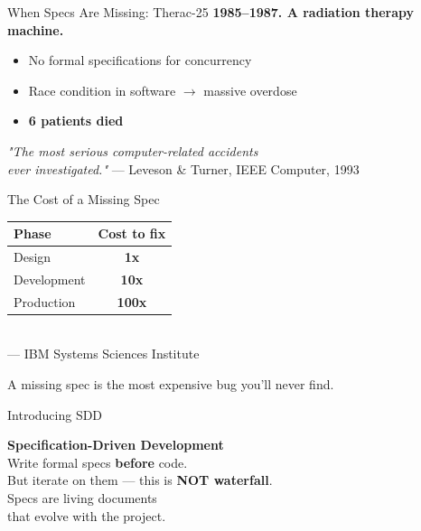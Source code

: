 \documentclass[aspectratio=169,18pt]{beamer}
\begin{document}
\begin{frame}{When Specs Are Missing: Therac-25}
  \vspace{0.3em}
  \textbf{1985--1987. A radiation therapy machine.}\\[0.8em]
  \begin{itemize}\setlength\itemsep{0.5em}
    \item No formal specifications for concurrency
    \item Race condition in software $\rightarrow$ massive overdose
    \item \textbf{\color{openred}6 patients died}
  \end{itemize}
  \vspace{0.8em}
  \small\color{opengray}\textit{"The most serious computer-related accidents\\
  ever investigated."} — Leveson \& Turner, IEEE Computer, 1993
\end{frame}

\begin{frame}{The Cost of a Missing Spec}
  \vspace{0.5em}
  \begin{center}
    \begin{tabular}{lc}
      \toprule
      \textbf{Phase} & \textbf{Cost to fix} \\
      \midrule
      Design   & \textbf{\color{opengreen}1x} \\[0.4em]
      Development & \textbf{\color{opengray}10x} \\[0.4em]
      Production  & \textbf{\color{openred}100x} \\
      \bottomrule
    \end{tabular}\\[1em]
    \small\color{opengray}— IBM Systems Sciences Institute
  \end{center}
  \vspace{0.5em}
  \normalsize A missing spec is the most expensive bug you'll never find.
\end{frame}


\begin{frame}{Introducing SDD}
  \vspace{1em}
  \begin{center}
    {\Large\textbf{Specification-Driven Development}}\\[1.5em]
    \normalsize
    Write formal specs \textbf{before} code.\\[0.5em]
    But iterate on them — this is \textbf{NOT waterfall}.\\[1em]
    Specs are living documents\\
    that evolve with the project.
  \end{center}
\end{frame}
\end{document}
